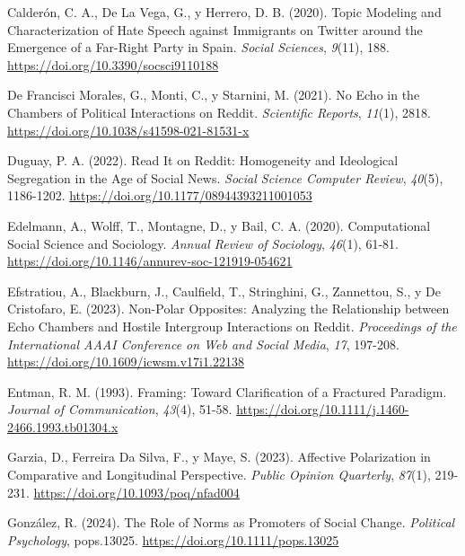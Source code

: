 \documentclass[
  letterpaper,
  numbers=noendperiod,
  fontsize=11pt,
  DIV=12,
  titlepage=false]{scrreprt}
\newlength{\cslhangindent}
\newenvironment{CSLReferences}[2] %
 {\begin{list}{}{%
  \setlength{\itemindent}{0pt}
  \setlength{\leftmargin}{0pt}
  \setlength{\parsep}{0pt}
  \ifodd #1
   \setlength{\leftmargin}{\cslhangindent}
   \setlength{\itemindent}{-1\cslhangindent}
  \fi
  \setlength{\itemsep}{#2\baselineskip}}}
 {\end{list}}
\begin{document}
\begin{CSLReferences}{1}{0}
Calderón, C. A., De La Vega, G., y Herrero, D. B. (2020). Topic
{Modeling} and {Characterization} of {Hate Speech} against {Immigrants}
on {Twitter} around the {Emergence} of a {Far-Right Party} in {Spain}.
\emph{Social Sciences}, \emph{9}(11), 188.
\url{https://doi.org/10.3390/socsci9110188}

De Francisci Morales, G., Monti, C., y Starnini, M. (2021). No Echo in
the Chambers of Political Interactions on {Reddit}. \emph{Scientific
Reports}, \emph{11}(1), 2818.
\url{https://doi.org/10.1038/s41598-021-81531-x}

Duguay, P. A. (2022). Read It on {Reddit}: {Homogeneity} and
{Ideological Segregation} in the {Age} of {Social News}. \emph{Social
Science Computer Review}, \emph{40}(5), 1186-1202.
\url{https://doi.org/10.1177/08944393211001053}

Edelmann, A., Wolff, T., Montagne, D., y Bail, C. A. (2020).
Computational {Social Science} and {Sociology}. \emph{Annual Review of
Sociology}, \emph{46}(1), 61-81.
\url{https://doi.org/10.1146/annurev-soc-121919-054621}

Efstratiou, A., Blackburn, J., Caulfield, T., Stringhini, G., Zannettou,
S., y De Cristofaro, E. (2023). Non-Polar {Opposites}: {Analyzing} the
{Relationship} between {Echo Chambers} and {Hostile Intergroup
Interactions} on {Reddit}. \emph{Proceedings of the International AAAI
Conference on Web and Social Media}, \emph{17}, 197-208.
\url{https://doi.org/10.1609/icwsm.v17i1.22138}

Entman, R. M. (1993). Framing: Toward Clarification of a Fractured
Paradigm. \emph{Journal of Communication}, \emph{43}(4), 51-58.
\url{https://doi.org/10.1111/j.1460-2466.1993.tb01304.x}

Garzia, D., Ferreira Da Silva, F., y Maye, S. (2023). Affective
{Polarization} in {Comparative} and {Longitudinal Perspective}.
\emph{Public Opinion Quarterly}, \emph{87}(1), 219-231.
\url{https://doi.org/10.1093/poq/nfad004}

González, R. (2024). The Role of Norms as Promoters of Social Change.
\emph{Political Psychology}, pops.13025.
\url{https://doi.org/10.1111/pops.13025}


\end{CSLReferences}
\end{document}
